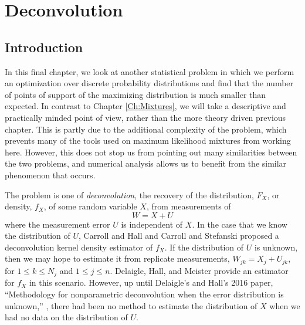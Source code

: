 \chapter{Deconvolution}
\label{Ch:Deconvolution}



\section{Introduction}
	In this final chapter, we look at another statistical problem in which we perform an optimization over discrete probability distributions and find that the number of points of support of the maximizing distribution is much smaller than expected. In contrast to Chapter \ref{Ch:Mixtures}, we will take a descriptive and practically minded point of view, rather than the more theory driven previous chapter. This is partly due to the additional complexity of the problem, which prevents many of the tools used on maximum likelihood mixtures from working here. However, this does not stop us from pointing out many similarities between the two problems, and numerical analysis allows us to benefit from the similar phenomenon that occurs.

	The problem is one of \emph{deconvolution}, the recovery of the distribution, $F_X$, or density, $f_X$, of some random variable $X$, from measurements of
	\begin{equation}
		W = X + U
	\end{equation}
	where the measurement error $U$ is independent of $X$. In the case that we know the distribution of $U$, Carroll and Hall \cite{Carroll1988-aj} and Carroll and Stefanski \cite{Stefanski1990-uo} proposed a deconvolution kernel density estimator of $f_X$. If the distribution of $U$ is unknown, then we may hope to estimate it from replicate measurements, $W_{jk} = X_j + U_{jk}$, for $1 \leq k \leq N_j$ and $1 \leq j \leq n$. Delaigle, Hall, and Meister provide an estimator for $f_X$ in this scenario. However, up until Delaigle's and Hall's 2016 paper, ``Methodology for nonparametric deconvolution when the error distribution is unknown,'' \cite{Delaigle2016-la}, there had been no method to estimate the distribution of $X$ when we had no data on the distribution of $U$.

